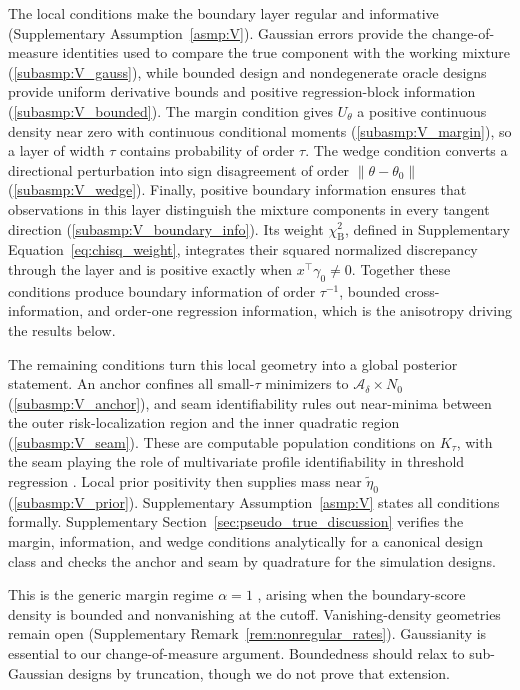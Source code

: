 \documentclass[11pt]{article}
\theoremstyle{definition}
\theoremstyle{plain}
\begin{document}
The local conditions make the boundary layer regular and informative (Supplementary Assumption~\ref{asmp:V}). Gaussian errors provide the change-of-measure identities used to compare the true component with the working mixture (\ref{subasmp:V_gauss}), while bounded design and nondegenerate oracle designs provide uniform derivative bounds and positive regression-block information (\ref{subasmp:V_bounded}). The margin condition gives $U_\theta$ a positive continuous density near zero with continuous conditional moments (\ref{subasmp:V_margin}), so a layer of width $\tau$ contains probability of order $\tau$. The wedge condition converts a directional perturbation into sign disagreement of order $\|\theta-\theta_0\|$ (\ref{subasmp:V_wedge}). Finally, positive boundary information ensures that observations in this layer distinguish the mixture components in every tangent direction (\ref{subasmp:V_boundary_info}). Its weight $\chi^2_{\mathrm B}$, defined in Supplementary Equation~\eqref{eq:chisq_weight}, integrates their squared normalized discrepancy through the layer and is positive exactly when $x^\top\gamma_0\neq0$. Together these conditions produce boundary information of order $\tau^{-1}$, bounded cross-information, and order-one regression information, which is the anisotropy driving the results below.

The remaining conditions turn this local geometry into a global posterior statement. An anchor confines all small-$\tau$ minimizers to $\mathcal A_\delta\times N_0$ (\ref{subasmp:V_anchor}), and seam identifiability rules out near-minima between the outer risk-localization region and the inner quadratic region (\ref{subasmp:V_seam}). These are computable population conditions on $K_\tau$, with the seam playing the role of multivariate profile identifiability in threshold regression \citep{Hansen2000}. Local prior positivity then supplies mass near $\tilde\eta_0$ (\ref{subasmp:V_prior}). Supplementary Assumption~\ref{asmp:V} states all conditions formally. Supplementary Section~\ref{sec:pseudo_true_discussion} verifies the margin, information, and wedge conditions analytically for a canonical design class and checks the anchor and seam by quadrature for the simulation designs.

This is the generic margin regime $\alpha=1$ \citep{Tsybakov2005,Audibert2007,Mukherjee2023}, arising when the boundary-score density is bounded and nonvanishing at the cutoff. Vanishing-density geometries remain open (Supplementary Remark~\ref{rem:nonregular_rates}). Gaussianity is essential to our change-of-measure argument. Boundedness should relax to sub-Gaussian designs by truncation, though we do not prove that extension.
\end{document}
